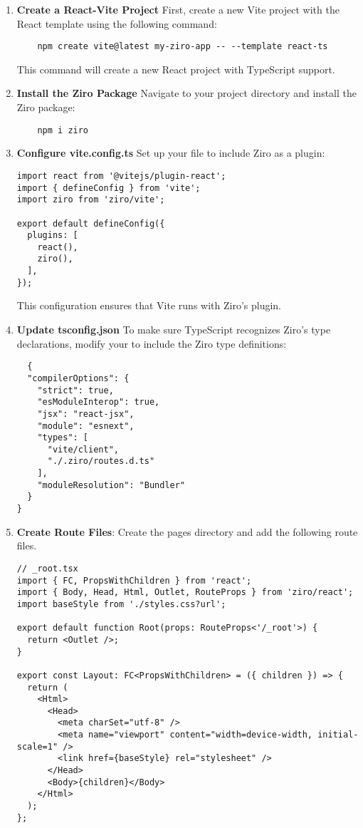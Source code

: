 \begin{enumerate}
  \item \textbf{Create a React-Vite Project} First, create a new Vite project with the React template using the following command:
  \begin{verbatim}
    npm create vite@latest my-ziro-app -- --template react-ts
  \end{verbatim}
  This command will create a new React project with TypeScript support.

  \item \textbf{Install the Ziro Package} Navigate to your project directory and install the Ziro package:
  \begin{verbatim}
    npm i ziro
  \end{verbatim}
  \item \textbf{Configure vite.config.ts} Set up your  file to include Ziro as a plugin:
  \begin{verbatim}
import react from '@vitejs/plugin-react';
import { defineConfig } from 'vite';
import ziro from 'ziro/vite';

export default defineConfig({
  plugins: [
    react(),
    ziro(),
  ],
});
\end{verbatim}
This configuration ensures that Vite runs with Ziro’s plugin.

\item \textbf{Update tsconfig.json} To make sure TypeScript recognizes Ziro's type declarations, modify your  to include the Ziro type definitions:
\begin{verbatim}
  {
  "compilerOptions": {
    "strict": true,
    "esModuleInterop": true,
    "jsx": "react-jsx",
    "module": "esnext",
    "types": [
      "vite/client",
      "./.ziro/routes.d.ts"
    ],
    "moduleResolution": "Bundler"
  }
}
\end{verbatim}

\item \textbf{Create Route Files}: Create the pages directory and add the following route files.
  \begin{verbatim}
// _root.tsx
import { FC, PropsWithChildren } from 'react';
import { Body, Head, Html, Outlet, RouteProps } from 'ziro/react';
import baseStyle from './styles.css?url';

export default function Root(props: RouteProps<'/_root'>) {
  return <Outlet />;
}

export const Layout: FC<PropsWithChildren> = ({ children }) => {
  return (
    <Html>
      <Head>
        <meta charSet="utf-8" />
        <meta name="viewport" content="width=device-width, initial-scale=1" />
        <link href={baseStyle} rel="stylesheet" />
      </Head>
      <Body>{children}</Body>
    </Html>
  );
};
  \end{verbatim}


\end{enumerate}
